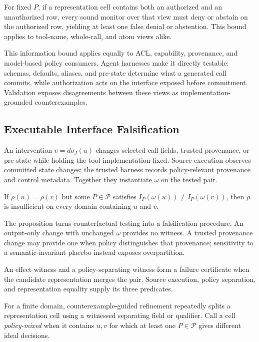 For fixed $P$, if a representation cell contains both an authorized and an
unauthorized row, every sound monitor over that view must deny or abstain on
the authorized row, yielding at least one false denial or abstention. This bound applies to tool-name, whole-call, and atom
views alike.

This information bound applies equally to ACL, capability, provenance, and
model-based policy consumers. Agent harnesses make it directly testable:
schemas, defaults, aliases, and pre-state determine what a generated call
commits, while authorization acts on the interface exposed before commitment.
Validation exposes disagreements between these views as
implementation-grounded counterexamples.

\subsection{Executable Interface Falsification}

An intervention $v=do_J(u)$ changes selected call fields, trusted provenance,
or pre-state while holding the tool implementation fixed.  Source execution
observes committed state changes; the trusted harness records policy-relevant
provenance and control metadata.  Together they instantiate $\omega$ on the
tested pair.

\begin{proposition}
\label{prop:mediation-gap}
If $\rho(u)=\rho(v)$ but some $P\in\mathcal P$ satisfies
$I_P(\omega(u))\ne I_P(\omega(v))$, then $\rho$ is insufficient on every domain
containing $u$ and $v$.
\end{proposition}

The proposition turns counterfactual testing into a falsification procedure.
An output-only change with unchanged $\omega$ provides no witness. A trusted
provenance change may provide one when policy distinguishes that provenance;
sensitivity to a semantic-invariant placebo instead exposes overpartition.

An effect witness and a policy-separating witness form a failure certificate
when the candidate representation merges the pair. Source execution, policy
separation, and representation equality supply its three predicates.

For a finite domain, counterexample-guided refinement repeatedly splits a
representation cell using a witnessed separating field or qualifier.  Call a
cell \emph{policy-mixed} when it contains $u,v$ for which at least one
$P\in\mathcal P$ gives different ideal decisions.

